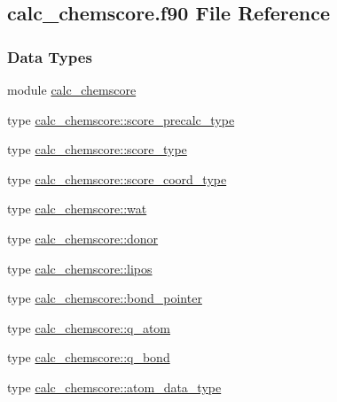 \hypertarget{calc__chemscore_8f90}{\subsection{calc\-\_\-chemscore.\-f90 File Reference}
\label{calc__chemscore_8f90}
}
\subsubsection*{Data Types}
\begin{DoxyCompactItemize}
\item 
module \hyperlink{classcalc__chemscore}{calc\-\_\-chemscore}
\item 
type \hyperlink{structcalc__chemscore_1_1score__precalc__type}{calc\-\_\-chemscore\-::score\-\_\-precalc\-\_\-type}
\item 
type \hyperlink{structcalc__chemscore_1_1score__type}{calc\-\_\-chemscore\-::score\-\_\-type}
\item 
type \hyperlink{structcalc__chemscore_1_1score__coord__type}{calc\-\_\-chemscore\-::score\-\_\-coord\-\_\-type}
\item 
type \hyperlink{structcalc__chemscore_1_1wat}{calc\-\_\-chemscore\-::wat}
\item 
type \hyperlink{structcalc__chemscore_1_1donor}{calc\-\_\-chemscore\-::donor}
\item 
type \hyperlink{structcalc__chemscore_1_1lipos}{calc\-\_\-chemscore\-::lipos}
\item 
type \hyperlink{structcalc__chemscore_1_1bond__pointer}{calc\-\_\-chemscore\-::bond\-\_\-pointer}
\item 
type \hyperlink{structcalc__chemscore_1_1q__atom}{calc\-\_\-chemscore\-::q\-\_\-atom}
\item 
type \hyperlink{structcalc__chemscore_1_1q__bond}{calc\-\_\-chemscore\-::q\-\_\-bond}
\item 
type \hyperlink{structcalc__chemscore_1_1atom__data__type}{calc\-\_\-chemscore\-::atom\-\_\-data\-\_\-type}
\end{DoxyCompactItemize}
